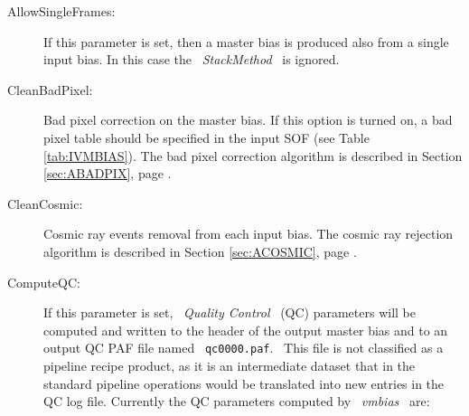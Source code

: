 \begin{description}

\item [AllowSingleFrames:]  If this parameter is set, then a master bias
                        is produced also from a single input bias.
                        In this case the \ {\it StackMethod} \ is ignored.


\item [CleanBadPixel:]  Bad pixel correction on the master bias.
                        If this option is turned on, a bad pixel
                        table should be specified in the input SOF
                        (see Table \ref{tab:IVMBIAS}). The bad pixel
                        correction algorithm is described in Section
                        \ref{sec:ABADPIX}, page \pageref{sec:ABADPIX}.

\item [CleanCosmic:]    Cosmic ray events removal from each input bias.
                        The cosmic ray rejection algorithm is described 
                        in Section \ref{sec:ACOSMIC}, page \pageref{sec:ACOSMIC}.

\item [ComputeQC:]      If this parameter is set, \ {\it Quality Control}
                        \ (QC) parameters will be computed and written to 
                        the header of the output master bias and to an 
                        output QC PAF file named \ {\tt qc0000.paf}. 
                        \ This file is not classified as a pipeline recipe 
                        product, as it is an intermediate dataset 
                        that in the standard pipeline operations would 
                        be translated into new entries in the QC log file. 
                        Currently the QC parameters computed by 
                        \ {\it vmbias} \ are:


\end{description}
